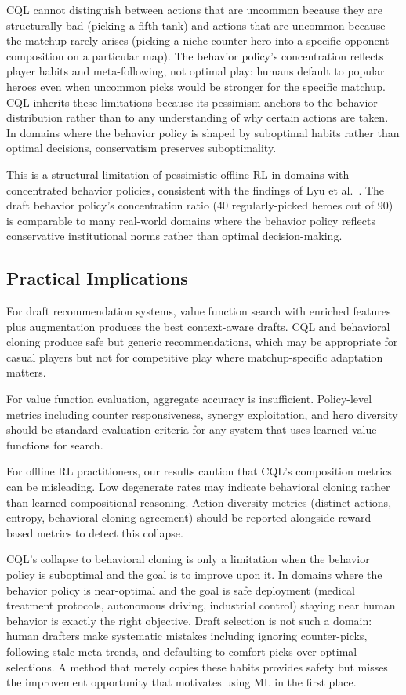 \documentclass[journal]{IEEEtran}
\begin{document}
CQL cannot distinguish between actions that are uncommon because they are structurally bad (picking a fifth tank) and actions that are uncommon because the matchup rarely arises (picking a niche counter-hero into a specific opponent composition on a particular map). The behavior policy's concentration reflects player habits and meta-following, not optimal play: humans default to popular heroes even when uncommon picks would be stronger for the specific matchup. CQL inherits these limitations because its pessimism anchors to the behavior distribution rather than to any understanding of why certain actions are taken. In domains where the behavior policy is shaped by suboptimal habits rather than optimal decisions, conservatism preserves suboptimality.

This is a structural limitation of pessimistic offline RL in domains with concentrated behavior policies, consistent with the findings of Lyu et al.~\cite{lyu2022mildly}. The draft behavior policy's concentration ratio (40 regularly-picked heroes out of 90) is comparable to many real-world domains where the behavior policy reflects conservative institutional norms rather than optimal decision-making.

\subsection{Practical Implications}

For draft recommendation systems, value function search with enriched features plus augmentation produces the best context-aware drafts. CQL and behavioral cloning produce safe but generic recommendations, which may be appropriate for casual players but not for competitive play where matchup-specific adaptation matters.

For value function evaluation, aggregate accuracy is insufficient. Policy-level metrics including counter responsiveness, synergy exploitation, and hero diversity should be standard evaluation criteria for any system that uses learned value functions for search.

For offline RL practitioners, our results caution that CQL's composition metrics can be misleading. Low degenerate rates may indicate behavioral cloning rather than learned compositional reasoning. Action diversity metrics (distinct actions, entropy, behavioral cloning agreement) should be reported alongside reward-based metrics to detect this collapse.

CQL's collapse to behavioral cloning is only a limitation when the behavior policy is suboptimal and the goal is to improve upon it. In domains where the behavior policy is near-optimal and the goal is safe deployment (medical treatment protocols, autonomous driving, industrial control) staying near human behavior is exactly the right objective. Draft selection is not such a domain: human drafters make systematic mistakes including ignoring counter-picks, following stale meta trends, and defaulting to comfort picks over optimal selections. A method that merely copies these habits provides safety but misses the improvement opportunity that motivates using ML in the first place.
\end{document}
